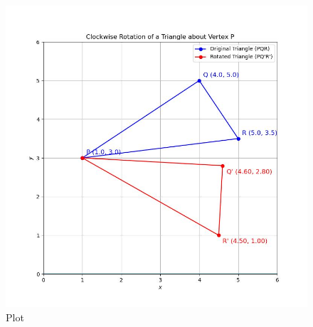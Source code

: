 \documentclass[journal]{IEEEtran}
\begin{document}
\begin{figure}[h!]
	\centering
	\includegraphics[width=\columnwidth]{figs/plot_c.jpg}
	\caption*{Plot}
	\label{fig:fig}
\end{figure}
\end{document}
